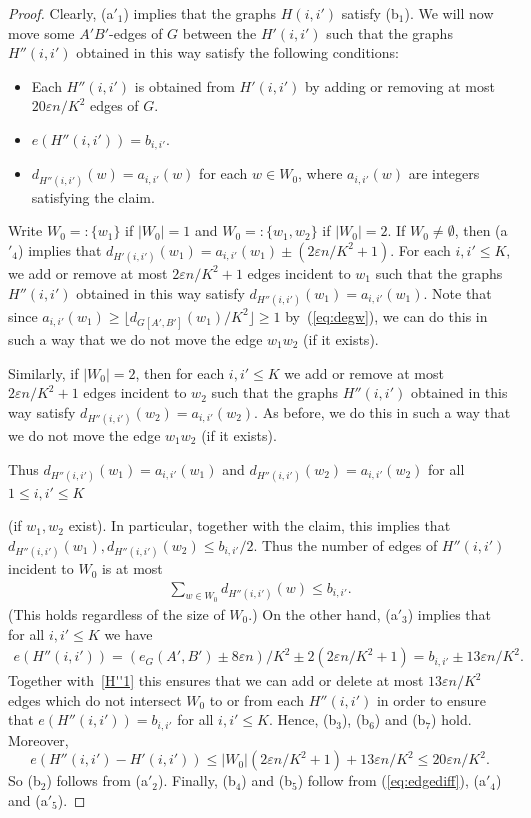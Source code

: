 \documentclass{memo-l}
\def\COMMENT#1{}
\def\eps{\varepsilon}
\numberwithin{section}{chapter}
\numberwithin{equation}{section}
\numberwithin{firstthm}{section}
\numberwithin{figure}{section}
\begin{document}
{\begin{proof}
Clearly, (a$'_1$) implies that the graphs $H(i,i')$ satisfy (b$_1$). We will now move some $A'B'$-edges of $G$ between
the $H'(i,i')$ such that the graphs $H''(i,i')$ obtained in this way satisfy the following conditions:
\begin{itemize}
\item Each $H''(i,i')$ is obtained from $H'(i,i')$ by adding or removing at most $20\eps n/K^2$ edges of $G$.
\item $e(H''(i,i'))=b_{i,i'}$.
\item $d_{H''(i,i')}(w)=a_{i,i'}(w)$ for each $w\in W_0$, where $a_{i,i'}(w)$ are integers satisfying the claim.
\end{itemize}
Write $W_0=:\{w_1\}$ if $|W_0|=1$ and $W_0=:\{w_1,w_2\}$ if $|W_0|=2$.
If $W_0 \ne \emptyset$, then (a$'_4$) implies that $d_{H'(i,i')}(w_1 )  =   a_{i,i'}(w_1)  \pm (2 \eps n/K^2+1)$.
For each $i,i'\le K$, we add or remove at most $2 \eps n /K^2+1$ edges incident to $w_1$
such that the graphs $H''(i,i')$ obtained in this way satisfy $d_{H''(i,i')}(w_1) =  a_{i,i'}(w_1)$.
Note that since $a_{i,i'}(w_1) \ge \lfloor d_{G[A',B']}(w_1) /K^2 \rfloor \ge 1$ by~(\ref{eq:degw}), we can do this in such a way that
we do not move the edge $w_1w_2$ (if it exists).%
\COMMENT{This is not really needed.}
Similarly, if $|W_0|=2$, then for each $i,i'\le K$ we add or remove at most $2 \eps n /K^2+1$ edges incident to $w_2$
such that the graphs $H''(i,i')$ obtained in this way satisfy $d_{H''(i,i')}(w_2) =  a_{i,i'}(w_2)$.
As before, we do this in such a way that we do not move the edge $w_1w_2$ (if it exists).

Thus $d_{H''(i,i')}(w_1)  =  a_{i,i'}(w_1)$ and $d_{H''(i,i')}(w_2) =  a_{i,i'}(w_2)$
for all $1 \le i,i' \le K$%
\COMMENT{AL: added $1 \le$}
 (if $w_1,w_2$ exist).
In particular, together with the claim, this implies that $d_{H''(i,i')}(w_1), d_{H''(i,i')}(w_2) \le b_{i,i'}/2$. Thus the number of edges
of $H''(i,i')$ incident to $W_0$ is at most
\begin{align}
	\sum_{w \in W_0}d_{H''(i,i')}(w) \le b_{i,i'}.  \label{H''1}
\end{align}
(This holds regardless of the size of $W_0$.) On the other hand, (a$'_3$) implies that for all $i, i' \le K$ we have
\begin{align}
e ( H''(i,i') )   =  ( e_{G}(A',B')  \pm  8 \eps n ) /K^2 \pm 2(2 \eps n /K^2 + 1) = b_{i,i'} \pm 13 \eps n/K^2. \nonumber
\end{align}
Together with~\eqref{H''1} this ensures that we can add or delete at most $13 \eps n/K^2$ edges which do not intersect $W_0$
to or from each $H''(i,i')$ in order to ensure that $e(H''(i,i')) = b_{i,i'}$ for all $i,i' \le K$.
Hence, (b$_3$), (b$_6$) and (b$_7$) hold. Moreover,
\begin{equation}\label{eq:edgediff}
e(H''(i,i')-H'(i,i'))\le |W_0| (2\eps n/K^2 +1) + 13 \eps n/K^2 \le 20 \eps n/K^2.
\end{equation}
So (b$_2$) follows from (a$'_2$). Finally, (b$_4$) and (b$_5$) follow from (\ref{eq:edgediff}), (a$'_4$) and (a$'_5$).
\end{proof}

}
\end{document}
